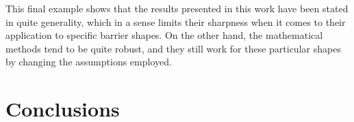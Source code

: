 \documentclass[12pt]{article}
\theoremstyle{definition}
\begin{document}
This final example shows that the results presented in this work have been stated in quite generality, which in a sense limits their sharpness when it comes to their application to specific barrier shapes. On the other hand, the mathematical methods tend to be quite robust, and they still work for these particular shapes by changing the assumptions employed.





\section{Conclusions}
\label{sec:conclusions}
\end{document}
